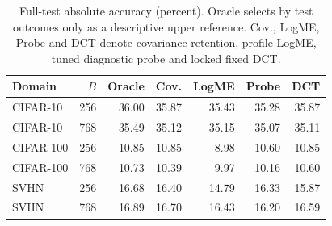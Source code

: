 \begin{table}[tb]\centering\small
\caption{Full-test absolute accuracy (percent). Oracle selects by test outcomes only as a descriptive upper reference. Cov., LogME, Probe and DCT denote covariance retention, profile LogME, tuned diagnostic probe and locked fixed DCT.}\label{tab:absolute}
\begin{tabular}{lrrrrrr}\toprule
Domain & $B$ & Oracle & Cov. & LogME & Probe & DCT\\\midrule
CIFAR-10 & 256 & 36.00 & 35.87 & 35.43 & 35.28 & 35.87\\
CIFAR-10 & 768 & 35.49 & 35.12 & 35.15 & 35.07 & 35.11\\
CIFAR-100 & 256 & 10.85 & 10.85 & 8.98 & 10.60 & 10.85\\
CIFAR-100 & 768 & 10.73 & 10.39 & 9.97 & 10.16 & 10.60\\
SVHN & 256 & 16.68 & 16.40 & 14.79 & 16.33 & 15.87\\
SVHN & 768 & 16.89 & 16.70 & 16.43 & 16.20 & 16.59\\
\bottomrule\end{tabular}
\end{table}
